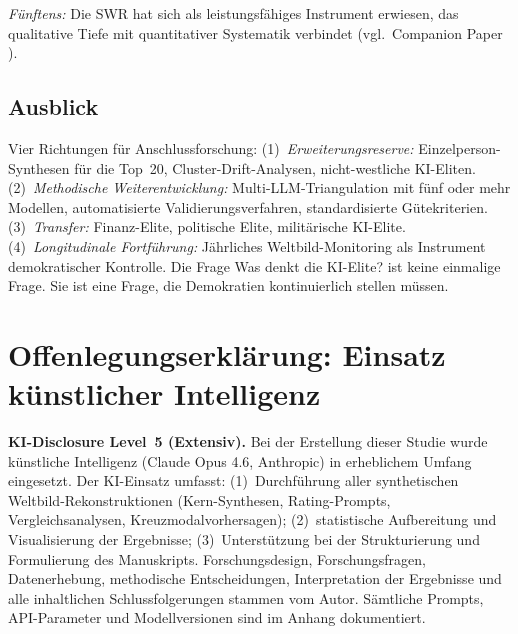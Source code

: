 \documentclass[12pt,a4paper]{article}
\begin{document}
\emph{F\"unftens:} Die SWR hat sich als leistungsf\"ahiges Instrument erwiesen, das qualitative Tiefe mit quantitativer Systematik verbindet (vgl.\ Companion Paper \citealt{Geiger2026SWR}).

\subsection{Ausblick}

Vier Richtungen f\"ur Anschlussforschung: (1)~\emph{Erweiterungsreserve:} Einzelperson-Synthesen f\"ur die Top~20, Cluster-Drift-Analysen, nicht-westliche KI-Eliten. (2)~\emph{Methodische Weiterentwicklung:} Multi-LLM-Triangulation mit f\"unf oder mehr Modellen, automatisierte Validierungsverfahren, standardisierte G\"utekriterien. (3)~\emph{Transfer:} Finanz-Elite, politische Elite, milit\"arische KI-Elite. (4)~\emph{Longitudinale Fortf\"uhrung:} J\"ahrliches Weltbild-Monitoring als Instrument demokratischer Kontrolle. Die Frage \glqq Was denkt die KI-Elite?\grqq{} ist keine einmalige Frage. Sie ist eine Frage, die Demokratien kontinuierlich stellen m\"ussen.


\section*{Offenlegungserkl\"arung: Einsatz k\"unstlicher Intelligenz}

\noindent\textbf{KI-Disclosure Level~5 (Extensiv).}
Bei der Erstellung dieser Studie wurde k\"unstliche Intelligenz (Claude Opus 4.6, Anthropic) in erheblichem Umfang eingesetzt. Der KI-Einsatz umfasst: (1)~Durchf\"uhrung aller synthetischen Weltbild-Rekonstruktionen (Kern-Synthesen, Rating-Prompts, Vergleichsanalysen, Kreuzmodalvorhersagen); (2)~statistische Aufbereitung und Visualisierung der Ergebnisse; (3)~Unterst\"utzung bei der Strukturierung und Formulierung des Manuskripts. Forschungsdesign, Forschungsfragen, Datenerhebung, methodische Entscheidungen, Interpretation der Ergebnisse und alle inhaltlichen Schlussfolgerungen stammen vom Autor. S\"amtliche Prompts, API-Parameter und Modellversionen sind im Anhang dokumentiert.


\end{document}
